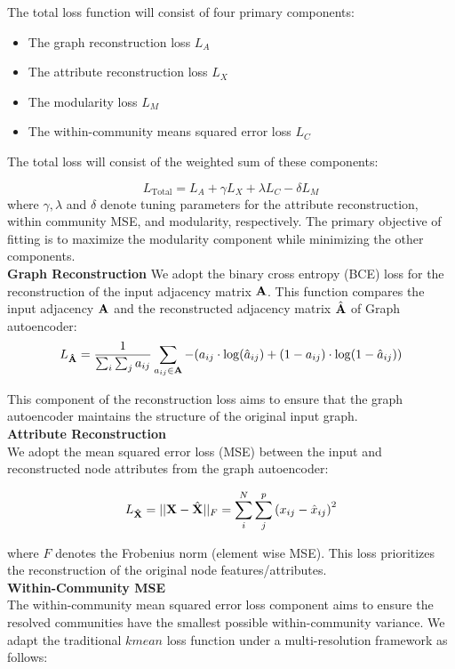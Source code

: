 \documentclass[a4paper,12pt]{article}
\begin{document}
\begin{itemize}
\begin{enumerate}
{{\begin{enumerate}
{					The total loss function will consist of four primary components: 
					\begin{itemize}
						\item The graph reconstruction loss ${L}_A$
						\item The attribute reconstruction loss ${L}_X$
						\item The modularity loss ${L}_M$
						\item The within-community means squared error loss ${L}_C$
					\end{itemize}
					The total loss will consist of the weighted sum of these components:
					
					\[L_{\text{Total}} = L_A + \gamma L_X + \lambda L_{C} - \delta L_M \]
					where $\gamma, \lambda$ and $\delta$ denote tuning parameters for the attribute reconstruction, within community MSE, and modularity, respectively. The primary objective of fitting is to maximize the modularity component while minimizing the other components. \\
					
					\textbf{Graph Reconstruction}
					We adopt the binary cross entropy (BCE) loss for the reconstruction of the input adjacency matrix ${\bf A}$. This function compares the input adjacency $\bf A$ and the reconstructed adjacency matrix  $\hat{\bf A}$ of Graph autoencoder: 
					\[L_{\bf \hat{A}} = \frac{1}{\sum_i\sum_j a_{ij}} \sum_{a_{ij}\in {\bf A}} -(a_{ij} \cdot\log(\hat{a}_{ij})+(1 - a_{ij})\cdot\log(1 - \hat{a}_{ij})) \]
					
					This component of the reconstruction loss aims to ensure that the graph autoencoder maintains the structure of the original input graph. \\
					
					
					\textbf{Attribute Reconstruction}\\
					We adopt the mean squared error loss (MSE) between the input and reconstructed node attributes from the graph autoencoder:
					
					\[L_{\bf \hat{X}} = ||{\bf X} - \hat{\bf X}||_F = \sum_i^N \sum_j^p \left(x_{ij} - \hat{x}_{ij}\right)^2 \]
					
					where $F$ denotes the Frobenius norm (element wise MSE). 
					This loss prioritizes the reconstruction of the original node features/attributes. \\
					
					
					\textbf{Within-Community MSE}\\
					The within-community mean squared error loss component aims to ensure the resolved communities have the smallest possible within-community variance. We adapt the traditional $kmean$ loss function under a multi-resolution framework as follows:\\
					
}
\end{enumerate}}}
\end{enumerate}
\end{itemize}
\end{document}
